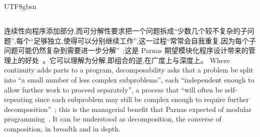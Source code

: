 \begin{CJK*}{UTF8}{gbsn}
\subsection{}
\label{sec:prior-decomposability}
\ifPaperChinese
连续性向程序添加部分,而可分解性要求把一个问题拆成``少数几个较不复杂的子问题'',每个``足够独立,使得可以分别继续工作'',这一过程``常常会自我重复,因为每个子问题可能仍然复杂到需要进一步分解''~\cite[第~40~页]{meyer1997-object-oriented-software-construction};这是 Parnas 期望模块化程序设计带来的管理上的好处~\cite[第~1054~页]{parnas1972-criteria-decomposing-modules}。它可以理解为分解,即组合的逆,在广度上与深度上。
\else
Where continuity adds parts to a program, decomposability asks that a problem be split into ``a small
number of less complex subproblems'', each ``independent enough to allow further work to proceed
separately'', a process that ``will often be
self-repeating since each subproblem may still be complex enough to require further
decomposition''~\cite[p.~40]{meyer1997-object-oriented-software-construction}; this is the managerial
benefit that Parnas expected of modular programming~\cite[p.~1054]{parnas1972-criteria-decomposing-modules}.
It can be understood as decomposition, the converse of composition, in breadth and in depth.
\fi


\end{CJK*}
